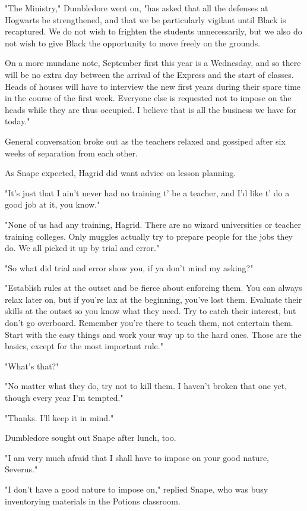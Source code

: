 "The Ministry," Dumbledore went on, "has asked that all the defenses at Hogwarts be strengthened, and that we be particularly vigilant until Black is recaptured. We do not wish to frighten the students unnecessarily, but we also do not wish to give Black the opportunity to move freely on the grounds.

\textooquote On a more mundane note, September first this year is a Wednesday, and so there will be no extra day between the arrival of the Express and the start of classes. Heads of houses will have to interview the new first years during their spare time in the course of the first week. Everyone else is requested not to impose on the heads while they are thus occupied. I believe that is all the business we have for today."

General conversation broke out as the teachers relaxed and gossiped after six weeks of separation from each other.

As Snape expected, Hagrid did want advice on lesson planning.

"It's just that I ain't never had no training t' be a teacher, and I'd like t' do a good job at it, you know."

"None of us had any training, Hagrid. There are no wizard universities or teacher training colleges. Only muggles actually try to prepare people for the jobs they do. We all picked it up by trial and error."

"So what did trial and error show you, if ya don't mind my asking?"

"Establish rules at the outset and be fierce about enforcing them. You can always relax later on, but if you're lax at the beginning, you've lost them. Evaluate their skills at the outset so you know what they need. Try to catch their interest, but don't go overboard. Remember you're there to teach them, not entertain them. Start with the easy things and work your way up to the hard ones. Those are the basics, except for the most important rule."

"What's that?"

"No matter what they do, try not to kill them. I haven't broken that one yet, though every year I'm tempted."

"Thanks. I'll keep it in mind."

Dumbledore sought out Snape after lunch, too.

"I am very much afraid that I shall have to impose on your good nature, Severus."

"I don't have a good nature to impose on," replied Snape, who was busy inventorying materials in the Potions classroom.

